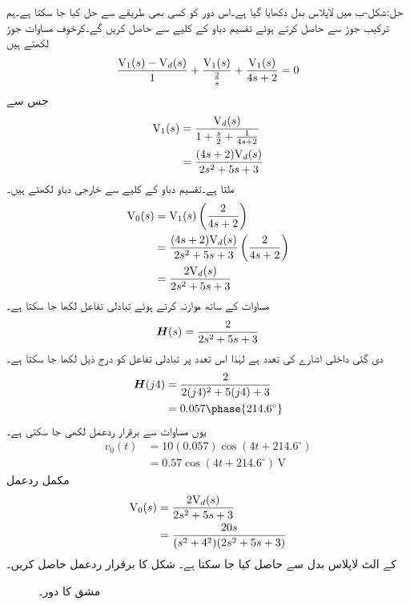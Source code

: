 حل:شکل-ب میں لاپلاس بدل دکھایا گیا ہے۔اس دور کو کسی بھی طریقے سے حل کیا جا سکتا ہے۔ہم ترکیب جوڑ سے  حاصل کرتے ہوئے تقسیم دباو کے کلیے سے   حاصل کریں گے۔کرخوف مساوات جوڑ لکھتے ہیں
\begin{align*}
\frac{{{\textup{V}}}_1(s)-{{\textup{V}}}_d(s)}{1}+\frac{{{\textup{V}}}_1(s)}{\frac{2}{s}}+\frac{{{\textup{V}}}_1(s)}{4s+2}=0
\end{align*}
جس سے
\begin{align*}
{\ensuremath{{\textup{V}}}}_1(s)&=\frac{{{\textup{V}}}_d(s)}{1+\frac{s}{2}+\frac{1}{4s+2}}\\
&=\frac{(4s+2){{\textup{V}}}_d(s)}{2s^2+5s+3}
\end{align*}
ملتا ہے۔تقسیم دباو کے کلیے سے خارجی دباو لکھتے ہیں۔
\begin{align*}
{\ensuremath{{\textup{V}}}}_0(s)&={{\textup{V}}}_1(s)\left(\frac{2}{4s+2}\right)\\
&=\frac{(4s+2){{\textup{V}}}_d(s)}{2s^2+5s+3}\left(\frac{2}{4s+2}\right)\\
&=\frac{2{{\textup{V}}}_d(s)}{2s^2+5s+3}
\end{align*}
مساوات  کے ساتھ موازنہ کرتے ہوئے تبادلی تفاعل لکھا جا سکتا ہے۔
\begin{align*}
{\ensuremath{{\boldsymbol{H}}}}(s)=\frac{2}{2s^2+5s+3}
\end{align*}
دی گئی داخلی اشارے کی تعدد  ہے لہٰذا اس تعدد پر تبادلی تفاعل کو درج ذیل لکھا جا سکتا ہے۔
\begin{align*}
\bH(j4)&=\frac{2}{2(j4)^2+5(j4)+3}\\
&=0.057\phase{214.6^{\circ}}
\end{align*}
یوں مساوات  سے برقرار ردعمل لکھی جا سکتی ہے۔
\begin{align*}
v_0(t)&=10(0.057)\cos(4t+214.6^{\circ})\\
&=0.57\cos(4t+214.6^{\circ})\,\si{\volt}
\end{align*}
مکمل ردعمل 
\begin{align*}
{\ensuremath{{\textup{V}}}}_0(s)&=\frac{2{{\textup{V}}}_d(s)}{2s^2+5s+3}\\
&=\frac{20s}{(s^2+4^2)(2s^2+5s+3)}
\end{align*}
کے  الٹ لاپلاس بدل سے حاصل کیا جا سکتا ہے۔
شکل  کا برقرار ردعمل حاصل کریں۔
\begin{figure}
\centering
{}
\caption{مشق  کا دور۔}
\label{شکل_لاپلاس_استعمال_مشق_برقرار_الف}
\end{figure}

